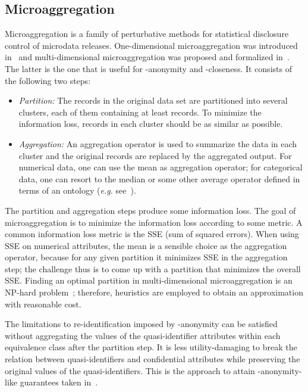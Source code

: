 \documentclass[10pt,journal,compsoc]{IEEEtran}
\theoremstyle{definition}
\theoremstyle{plain}
\begin{document}
\subsection{Microaggregation}
\label{micro}

Microaggregation is a family of perturbative methods
for statistical disclosure control of microdata releases. 
One-dimensional microaggregation was
introduced in~\cite{Defays1992Aggregates} 
and multi-dimensional microaggregation was proposed
and formalized in~\cite{Domingo02}.
The latter is the one that is useful
for -anonymity and -closeness.
It consists
of the following two steps:
\begin{itemize}
	\item {\em Partition:} The records in the original data set are partitioned
	into several clusters, each of them containing at least  records.
	To minimize the information loss, records in each cluster should be
	as similar as possible.
	\item {\em Aggregation:} An aggregation operator is used to summarize the
	data in each cluster 
	and the original records are replaced by the aggregated output.
 	For numerical data, one can use the mean as aggregation operator;
for categorical data, one can resort to the median or some 
	other average operator defined in terms of an ontology ({\em e.g.} 
see~\cite{Domingo13}).
\end{itemize}
The partition and aggregation steps produce some information loss.
The goal of microaggregation is to minimize the information loss according
to some metric. A common information loss metric is the SSE (sum of
squared errors). 
When using SSE on 
numerical attributes, the mean is a sensible choice
as the aggregation operator, because for any given partition 
it minimizes SSE in the aggregation step;
the challenge thus is to come up with a partition that minimizes the
overall SSE.
Finding an optimal partition in multi-dimensional
microaggregation is an NP-hard problem~\cite{Oganian01Complexity};
therefore, heuristics are employed to obtain an approximation with
reasonable cost.



The limitations to re-identification imposed by -anonymity can
be satisfied without aggregating the values of the quasi-identifier
attributes within each equivalence class after the partition step. 
It is less utility-damaging to break the relation 
between quasi-identifiers and confidential attributes 
while preserving the original values of the quasi-identifiers.
This is the approach to attain -anonymity-like guarantees 
taken in~\cite{Xiao2006Anatomy,Soria2012Probabilistic}.
\end{document}
